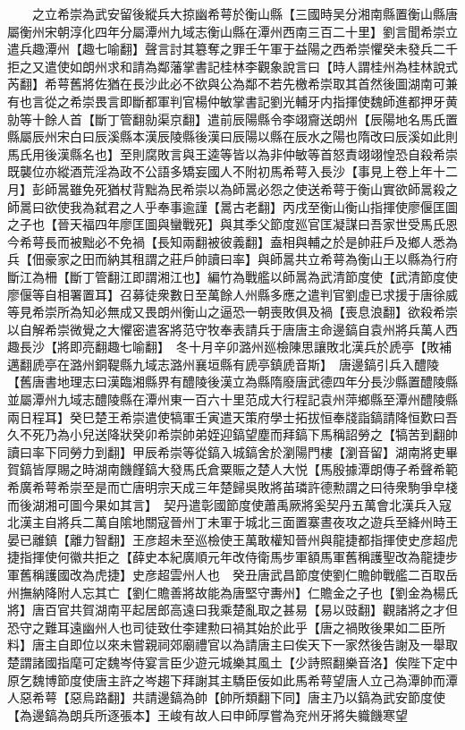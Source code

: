 　　之立希崇為武安留後縱兵大掠幽希萼於衡山縣【三國時吴分湘南縣置衡山縣唐屬衡州宋朝淳化四年分屬潭州九域志衡山縣在潭州西南三百二十里】劉言聞希崇立遣兵趣潭州【趣七喻翻】聲言討其簒奪之罪壬午軍于益陽之西希崇懼癸未發兵二千拒之又遣使如朗州求和請為鄰藩掌書記桂林李觀象說言曰【時人謂桂州為桂林說式芮翻】希萼舊將佐猶在長沙此必不欲與公為鄰不若先檄希崇取其首然後圖湖南可兼有也言從之希崇畏言即斷都軍判官楊仲敏掌書記劉光輔牙内指揮使魏師進都押牙黄勍等十餘人首【斷丁管翻勍渠京翻】遣前辰陽縣令李翊齎送朗州【辰陽地名馬氏置縣屬辰州宋白曰辰溪縣本漢辰陵縣後漢曰辰陽以縣在辰水之陽也隋改曰辰溪如此則馬氏用後漢縣名也】至則腐敗言與王逵等皆以為非仲敏等首怒責翊翊惶恐自殺希崇既襲位亦縱酒荒淫為政不公語多矯妄國人不附初馬希萼入長沙【事見上卷上年十二月】彭師暠雖免死猶杖背黜為民希崇以為師暠必怨之使送希萼于衡山實欲師暠殺之師暠曰欲使我為弑君之人乎奉事逾謹【暠古老翻】丙戌至衡山衡山指揮使廖偃匡圖之子也【晉天福四年廖匡圖與蠻戰死】與其季父節度廵官匡凝謀曰吾家世受馬氏恩今希萼長而被黜必不免禍【長知兩翻被彼義翻】盍相與輔之於是帥莊戶及鄉人悉為兵【佃豪家之田而納其租謂之莊戶帥讀曰率】與師暠共立希萼為衡山王以縣為行府斷江為柵【斷丁管翻江即謂湘江也】編竹為戰艦以師暠為武清節度使【武清節度使廖偃等自相署置耳】召募徒衆數日至萬餘人州縣多應之遣判官劉虛已求援于唐徐威等見希崇所為知必無成又畏朗州衡山之逼恐一朝喪敗俱及禍【喪息浪翻】欲殺希崇以自解希崇微覺之大懼密遣客將范守牧奉表請兵于唐唐主命邊鎬自袁州將兵萬人西趣長沙【將即亮翻趣七喻翻】　冬十月辛卯潞州廵檢陳思讓敗北漢兵於虒亭【敗補邁翻虒亭在潞州銅鞮縣九域志潞州襄垣縣有虒亭鎮虒音斯】　唐邊鎬引兵入醴陵【舊唐書地理志曰漢臨湘縣界有醴陵後漢立為縣隋廢唐武德四年分長沙縣置醴陵縣並屬潭州九域志醴陵縣在潭州東一百六十里范成大行程記袁州萍鄉縣至潭州醴陵縣兩日程耳】癸巳楚王希崇遣使犒軍壬寅遣天策府學士拓拔恒奉牋詣鎬請降恒歎曰吾久不死乃為小兒送降狀癸卯希崇帥弟姪迎鎬望塵而拜鎬下馬稱詔勞之【犒苦到翻帥讀曰率下同勞力到翻】甲辰希崇等從鎬入城鎬舍於瀏陽門樓【瀏音留】湖南將吏畢賀鎬皆厚賜之時湖南饑饉鎬大發馬氏倉粟賑之楚人大悦【馬殷據潭朗傳子希聲希範希廣希萼希崇至是而亡唐明宗天成三年楚歸吳敗將苖璘許德勲謂之曰待衆駒爭皁棧而後湖湘可圖今果如其言】　契丹遣彰國節度使蕭禹厥將奚契丹五萬會北漢兵入寇北漢主自將兵二萬自隂地關寇晉州丁未軍于城北三面置寨晝夜攻之遊兵至絳州時王晏已離鎮【離力智翻】王彦超未至巡檢使王萬敢權知晉州與龍捷都指揮使史彦超虎捷指揮使何徽共拒之【薛史本紀廣順元年改侍衛馬步軍額馬軍舊稱護聖改為龍捷步軍舊稱護國改為虎捷】史彦超雲州人也　癸丑唐武昌節度使劉仁贍帥戰艦二百取岳州撫納降附人忘其亡【劉仁贍善將故能為唐堅守夀州】仁贍金之子也【劉金為楊氏將】唐百官共賀湖南平起居郎高遠曰我乘楚亂取之甚易【易以豉翻】觀諸將之才但恐守之難耳遠幽州人也司徒致仕李建勲曰禍其始於此乎【唐之禍敗後果如二臣所料】唐主自即位以來未嘗親祠郊廟禮官以為請唐主曰俟天下一家然後告謝及一舉取楚謂諸國指麾可定魏岑侍宴言臣少遊元城樂其風土【少詩照翻樂音洛】俟陛下定中原乞魏博節度使唐主許之岑趨下拜謝其主驕臣佞如此馬希萼望唐人立己為潭帥而潭人惡希萼【惡烏路翻】共請邊鎬為帥【帥所類翻下同】唐主乃以鎬為武安節度使【為邊鎬為朗兵所逐張本】王峻有故人曰申師厚嘗為兖州牙將失軄饑寒望

